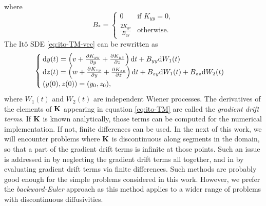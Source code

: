 where
\begin{equation} \label{eq:Bstar}
	B_* = \left\{ 
		\begin{array}{lr}
			0 & \mbox{if } K_{yy} = 0,\\
			\frac{2K_{yz}}{B_{yy}} & \mbox{otherwise}.
		\end{array}
	\right.
\end{equation}
The Itô SDE \eqref{eq:ito-TM-vec} can be rewritten as
\begin{equation} \label{eq:ito-TM}
	\begin{cases}
		\rm dy(t) = \left(v + \frac{\partial K_{yy}}{\partial y} + \frac{\partial K_{yz}}{\partial z} \right) \rm dt + B_{yy} \rm dW_1(t)\\
		\rm dz(t) = \left(w + \frac{\partial K_{zy}}{\partial y} + \frac{\partial K_{zz}}{\partial z} \right) \rm dt + B_{zy} \rm dW_1(t) + B_{zz} \rm dW_2(t)\\
		(y(0),z(0)) = (y_0,z_0),
	\end{cases}
\end{equation}
where $W_1(t)$ and $W_2(t)$ are independent Wiener processes. The derivatives of the elements of $\b K$ appearing in equation \eqref{eq:ito-TM} are called the \textit{gradient drift terms}. If $\b K$ is known analytically, those terms can be computed for the numerical implementation. If not, finite differences can be used. In the next of this work, we will encounter problems where $\b K$ is discontinuous along segments in the domain, so that a part of the gradient drift terms is infinite at those points.
Such an issue is addressed in \cite{prickett1981random} by neglecting the gradient drift terms all together, and in \cite{tompson1987numerical} by evaluating gradient drift terms via finite differences. Such methods are probably good enough for the simple problems considered in this work.
However, we prefer the \textit{backward-Euler} approach as this method applies to a wider range of problems with discontinuous diffusivities.




